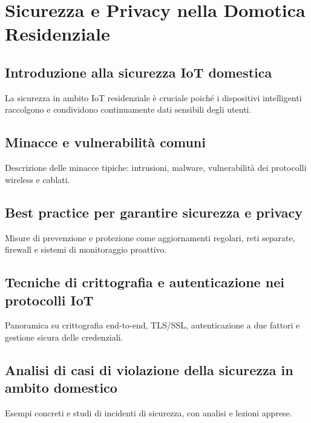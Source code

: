 
\chapter{Sicurezza e Privacy nella Domotica Residenziale}

\section{Introduzione alla sicurezza IoT domestica}
La sicurezza in ambito IoT residenziale è cruciale poiché i dispositivi intelligenti raccolgono e condividono continuamente dati sensibili degli utenti.

\section{Minacce e vulnerabilità comuni}
Descrizione delle minacce tipiche: intrusioni, malware, vulnerabilità dei protocolli wireless e cablati.

\section{Best practice per garantire sicurezza e privacy}
Misure di prevenzione e protezione come aggiornamenti regolari, reti separate, firewall e sistemi di monitoraggio proattivo.

\section{Tecniche di crittografia e autenticazione nei protocolli IoT}
Panoramica su crittografia end-to-end, TLS/SSL, autenticazione a due fattori e gestione sicura delle credenziali.

\section{Analisi di casi di violazione della sicurezza in ambito domestico}
Esempi concreti e studi di incidenti di sicurezza, con analisi e lezioni apprese.
